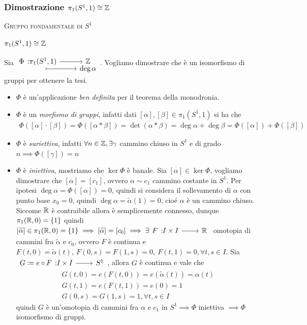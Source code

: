 \subsubsection{Dimostrazione $\pi_1(S^1, 1)\cong\mathbb{Z}$}
\begin{theorema}\textsc{Gruppo fondamentale di $S^1$}\\
	\begin{center}
		$\pi_1(S^1, 1)\cong\mathbb{Z}$
	\end{center}
\end{theorema}
\begin{demonstration}
	Sia $\displaystyle \funztot \Phi {\pi_1(S^1, 1)} \integerset {[\alpha]} {\deg\alpha}$. Vogliamo dimostrare che è un isomorfismo di gruppi per ottenere la tesi.
		\begin{itemize}
			\item $\Phi$ è un'applicazione \textit{ben definita} per il teorema della monodronia.
			\item $\Phi$ è un \textit{morfismo di gruppi}, infatti dati $[\alpha],[\beta]\in\pi_1(S^1, 1)$ si ha che
				\begin{gather*}
					\Phi([\alpha]\cdot [\beta])=\Phi([\alpha\ast\beta])=\det(\alpha\ast\beta)=\deg\alpha+\deg\beta=\Phi([\alpha])+\Phi([\beta])
				\end{gather*}
			\item $\Phi$ è \textit{suriettiva}, infatti $\forall n\in\mathbb{Z}, \exists \gamma$ cammino chiuso in $S^1$ e di grado $n\implies \Phi([\gamma])=n$
			\item $\Phi$ è \textit{iniettiva}, mostriamo che $\ker\Phi$ è banale. Sia $[\alpha]\in\ker\Phi$, vogliamo dimostrare che $[\alpha]=[c_1]$, ovvero $\alpha\sim c_1$ cammino costante in $S^1$. Per ipotesi $\deg\alpha=\Phi([\alpha])=0$, quindi si considera il sollevamento di $\alpha$ con punto base $x_0=0$, quindi $\deg\alpha=\widetilde{\alpha}(1)=0$, cioé $\alpha$ è un cammino chiuso. Siccome $\mathbb{R}$ è contraibile allora è semplicemente connesso, dunque $\pi_1(\mathbb{R}, 0)=\{1\}$ quindi $[\widetilde{\alpha}]\in\pi_1(\realset, 0)=\{1\}\implies [\widetilde{\alpha}]=[c_0]\implies \exists \funz F {I\times I}  \realset$ omotopia di cammini fra $\widetilde{\alpha}$ e $c_0$, ovvero $F$ è continua e $F(t,0)=\widetilde{\alpha}(t),\ F(0,s)=F(1,s)=0,\ F(t,1)=0, \forall t,s\in I$. Sia $\funz {G\coloneqq e\circ F} {I\times I} {S^1}$, allora $G$ è continua e vale che 
				\begin{gather*}
					G(t,0)=e(F(t,0))=e(\widetilde{\alpha}(t))=\alpha(t)\\
					G(t,1)=e(F(t,1))=e(0)=1\\
					G(0,s)=G(1,s)=1, \forall t,s\in I
				\end{gather*}
			quindi $G$ è un'omotopia di cammini fra $\alpha$ e $c_1$ in $S^1\implies \Phi$ iniettiva $\implies \Phi$ isomorfismo di gruppi.
		\end{itemize}	
\end{demonstration}

